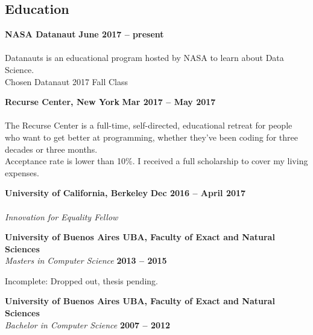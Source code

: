 \documentclass[margin,line]{resume}
\begin{document}
\begin{resume}
\newpage

\section{\mysidestyle Education}


\textbf{NASA Datanaut} \hfill \textbf{June 2017 -- present}\vspace{-3mm}\\\vspace{-1mm}
\\
Datanauts is an educational program hosted by NASA to learn about Data Science.
\\
Chosen Datanaut 2017 Fall Class



\textbf{Recurse Center, New York} \hfill \textbf{Mar 2017 -- May 2017}\vspace{-3mm}\\\vspace{-1mm}
\\
The Recurse Center is a full-time, self-directed, educational retreat for people who want to get better at programming, whether they've been coding for three decades or three months.  \\
Acceptance rate is lower than 10\%. I received a full scholarship to cover my living expenses.


\textbf{University of California, Berkeley} \hfill \textbf{Dec 2016 -- April 2017}\vspace{-3mm}\\\vspace{-1mm}
\\
\textsl{Innovation for Equality Fellow} 

\textbf{University of Buenos Aires UBA, Faculty of Exact and Natural Sciences} \vspace{2mm}\\\vspace{1mm}
\textsl{Masters in Computer Science} \hfill \textbf{2013 -- 2015}\vspace{-3mm}\\\vspace{-1mm}
\begin{list2}
	\item Incomplete: Dropped out, thesis pending.
\end{list2}

\textbf{University of Buenos Aires UBA, Faculty of Exact and Natural Sciences} \vspace{2mm}\\\vspace{1mm}
\textsl{Bachelor in Computer Science} \hfill \textbf{2007 -- 2012}\vspace{-3mm}\\\vspace{-1mm}



\end{resume}
\end{document}
